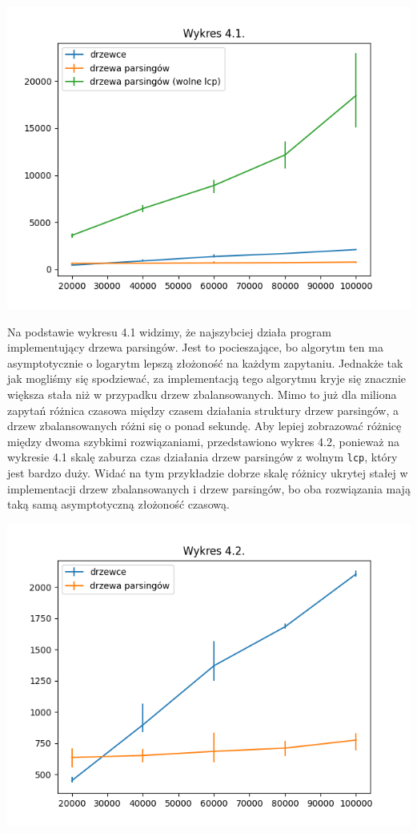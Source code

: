 \documentclass[declaration,shortabstract]{iithesis}
\theoremstyle{definition} \newtheorem{definition}{Definicja}[chapter]
\theoremstyle{remark} \newtheorem{remark}[definition]{Obserwacja}
\theoremstyle{plain} \newtheorem{theorem}[definition]{Twierdzenie}
\theoremstyle{remark} \newtheorem{example}{Przykład}[definition]
\theoremstyle{plain} \newtheorem{lemma}[definition]{Lemat}
\begin{document}
\begin{center}
    \includegraphics[width=\textwidth]{tablica1.png}
\end{center}

Na podstawie wykresu 4.1 widzimy, że najszybciej działa program implementujący drzewa parsingów. Jest to pocieszające, bo algorytm ten ma asymptotycznie o logarytm lepszą złożoność na każdym zapytaniu. Jednakże tak jak mogliśmy się spodziewać, za implementacją tego algorytmu kryje się znacznie większa stała niż w przypadku drzew zbalansowanych. Mimo to już dla miliona zapytań różnica czasowa między czasem działania struktury drzew parsingów, a drzew zbalansowanych różni się o ponad sekundę. Aby lepiej zobrazować różnicę między dwoma szybkimi rozwiązaniami, przedstawiono wykres 4.2, ponieważ na wykresie 4.1 skalę zaburza czas działania drzew parsingów z wolnym \texttt{lcp}, który jest bardzo duży. Widać na tym przykładzie dobrze skalę różnicy ukrytej stałej w implementacji drzew zbalansowanych i drzew parsingów, bo oba rozwiązania mają taką samą asymptotyczną złożoność czasową.

\begin{center}
    \includegraphics[width=\textwidth]{tablica2.png}
\end{center}
\end{document}
